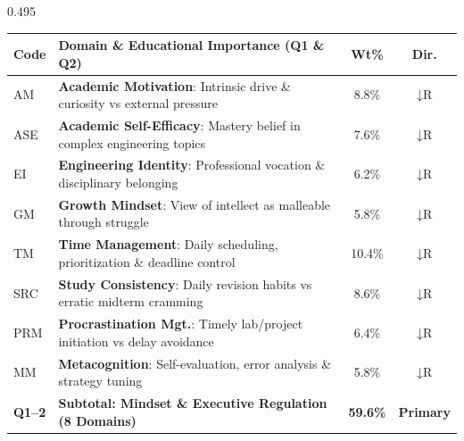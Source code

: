 \documentclass[aspectratio=169, 10pt]{beamer}
\begin{document}
\begin{frame}
  \begin{columns}[T]
    \begin{column}{0.495\textwidth}
      \begin{tcolorbox}[colback=white, colframe=BlueDeep, arc=1.5mm, boxrule=0.8pt, top=0.3mm, bottom=0.3mm, left=0.8mm, right=0.8mm]
        \centering\fontsize{4.7pt}{5.6pt}\selectfont
        \renewcommand{\arraystretch}{0.84}
        \begin{tabularx}{\linewidth}{@{}l X c c@{}}
          \toprule
          \textbf{Code} & \textbf{Domain \& Educational Importance (Q1 \& Q2)} & \textbf{Wt\%} & \textbf{Dir.} \\
          \midrule
          \rowcolor{BlueLight} AM & \textbf{Academic Motivation}: Intrinsic drive \& curiosity vs external pressure & 8.8\% & $\downarrow\text{R}$ \\
          \rowcolor{BlueLight} ASE & \textbf{Academic Self-Efficacy}: Mastery belief in complex engineering topics & 7.6\% & $\downarrow\text{R}$ \\
          \rowcolor{BlueLight} EI & \textbf{Engineering Identity}: Professional vocation \& disciplinary belonging & 6.2\% & $\downarrow\text{R}$ \\
          \rowcolor{BlueLight} GM & \textbf{Growth Mindset}: View of intellect as malleable through struggle & 5.8\% & $\downarrow\text{R}$ \\
          \midrule
          \rowcolor{CanvasBG} TM & \textbf{Time Management}: Daily scheduling, prioritization \& deadline control & 10.4\% & $\downarrow\text{R}$ \\
          \rowcolor{CanvasBG} SRC & \textbf{Study Consistency}: Daily revision habits vs erratic midterm cramming & 8.6\% & $\downarrow\text{R}$ \\
          \rowcolor{CanvasBG} PRM & \textbf{Procrastination Mgt.}: Timely lab/project initiation vs delay avoidance & 6.4\% & $\downarrow\text{R}$ \\
          \rowcolor{CanvasBG} MM & \textbf{Metacognition}: Self-evaluation, error analysis \& strategy tuning & 5.8\% & $\downarrow\text{R}$ \\
          \midrule
          \textbf{Q1--2} & \textbf{Subtotal: Mindset \& Executive Regulation (8 Domains)} & \textbf{59.6\%} & \textbf{Primary} \\
          \bottomrule
        \end{tabularx}
      \end{tcolorbox}
    \end{column}

\end{columns}
\end{frame}
\end{document}
